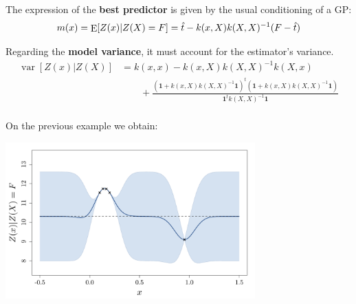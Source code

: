 \documentclass{beamer}
\DeclareMathOperator*{\Var}{var}
\DeclareMathOperator*{\E}{E}
\begin{document}
\begin{frame}{}
The expression of the \textbf{best predictor} is given by the usual conditioning of a GP:
\begin{equation*}
m(x) = \E[Z(x)|Z(X)=F] = \hat{t} - k(x,X) k(X,X)^{-1} (F - \hat{t}) \vspace{5mm}
\end{equation*} 

Regarding the \textbf{model variance}, it must account for the estimator's variance. 
{\small
\begin{equation*}
\begin{split}
\Var[Z(x)|Z(X)] &=  k(x,x) - k(x,X) k(X,X)^{-1} k(X,x)   \\
& \qquad + \frac{(\mathbf{1} + k(x,X)k(X,X)^{-1}\mathbf{1})^t(\mathbf{1} + k(x,X)k(X,X)^{-1}\mathbf{1})}{\mathbf{1}^t k(X,X)^{-1} \mathbf{1}} \\
\end{split}
\end{equation*} 
}
\end{frame}

\begin{frame}{}
On the previous example we obtain:
\begin{center}
	\includegraphics[height=6cm]{figures/trend_ko}
\end{center}
\end{frame}
\end{document}
